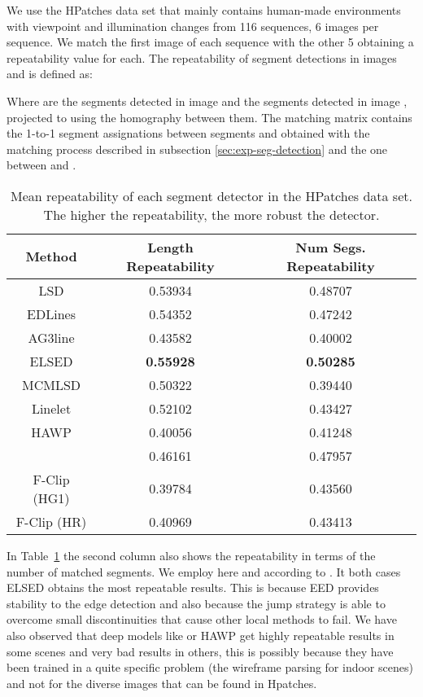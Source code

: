 \documentclass[preprint,12pt]{elsarticle}
\begin{document}
We use the HPatches\cite{hpatches_2017_cvpr} data set that mainly contains human-made environments with viewpoint and illumination changes from 116 sequences, 6 images per sequence. We match the first image of each sequence with the other 5 obtaining a repeatability value for each. The repeatability of segment detections in images  and  is defined as:



Where  are the segments detected in image  and  the segments detected in image , projected to  using the homography between them. 
The matching matrix  contains the 1-to-1 segment assignations between segments    and  obtained with the matching process described in subsection \ref{sec:exp-seg-detection} and  the one between  and .


\begin{table}
    \centering
    \begin{tabular}{|c|c|c|} \hline
    Method  & Length Repeatability & Num Segs. Repeatability \\ \hline
    LSD             & 0.53934 & 0.48707 \\ 
    EDLines         & 0.54352 & 0.47242 \\
    AG3line         & 0.43582 & 0.40002 \\
    ELSED           & \textbf{0.55928} & \textbf{0.50285} \\ \hline
MCMLSD          & 0.50322 &  0.39440 \\
    Linelet         & 0.52102 &  0.43427 \\
    HAWP            & 0.40056 & 0.41248 \\ 
     & 0.46161 & 0.47957 \\ 
    F-Clip (HG1)    & 0.39784 & 0.43560 \\ 
    F-Clip (HR)     & 0.40969 & 0.43413 \\ \hline
    \end{tabular}
    \caption{Mean repeatability of each segment detector in the HPatches data set. The higher the repeatability, the more robust the detector.}
    \label{tab:repeatability}
\end{table}
 
In Table~\ref{tab:repeatability} the second column also shows the repeatability in terms of the number of matched segments. We employ here  and  according to \cite{pautrat2021sold2}. It both cases ELSED obtains the most repeatable results. This is because EED provides stability to the edge detection and also because the jump strategy is able to overcome small discontinuities that cause other local methods to fail.
We have also observed that deep models like  or HAWP get highly repeatable results in some scenes and very bad results in others, this is possibly because they have been trained in a quite specific problem (the wireframe parsing for indoor scenes) and not for the diverse images that can be found in Hpatches. 
\end{document}

